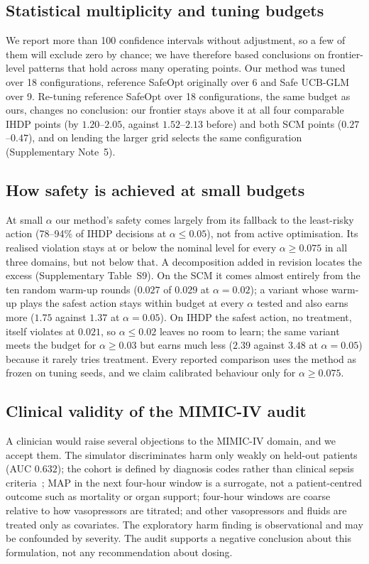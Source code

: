 \documentclass[10pt,a4paper]{article}
\begin{document}
\subsection*{Statistical multiplicity and tuning budgets}
We report more than 100 confidence intervals without adjustment, so a few of them will exclude zero by
chance; we have therefore based conclusions on frontier-level patterns that hold across many operating
points. Our method was tuned over 18 configurations, reference SafeOpt originally over 6 and Safe UCB-GLM over 9. Re-tuning reference SafeOpt over 18 configurations, the same budget as ours, changes no conclusion: our frontier stays above it at all four comparable IHDP points (by $1.20$--$2.05$, against $1.52$--$2.13$ before) and both SCM points ($0.27$--$0.47$), and on lending the larger grid selects the same configuration (Supplementary Note~5).

\subsection*{How safety is achieved at small budgets}
At small $\alpha$ our method's safety comes largely from its fallback to the least-risky action (78--94\% of IHDP decisions at $\alpha\le0.05$), not from active optimisation. Its realised violation stays at or below the nominal level for every $\alpha\ge0.075$ in all three domains, but not below that. A decomposition added in revision locates the excess (Supplementary Table~S9). On the SCM it comes almost entirely from the ten random warm-up rounds ($0.027$ of $0.029$ at $\alpha=0.02$); a variant whose warm-up plays the safest action stays within budget at every $\alpha$ tested and also earns more ($1.75$ against $1.37$ at $\alpha=0.05$). On IHDP the safest action, no treatment, itself violates at $0.021$, so $\alpha\le0.02$ leaves no room to learn; the same variant meets the budget for $\alpha\ge0.03$ but earns much less ($2.39$ against $3.48$ at $\alpha=0.05$) because it rarely tries treatment. Every reported comparison uses the method as frozen on tuning seeds, and we claim calibrated behaviour only for $\alpha\ge0.075$.

\subsection*{Clinical validity of the MIMIC-IV audit}
A clinician would raise several objections to the MIMIC-IV domain, and we accept them. The simulator
discriminates harm only weakly on held-out patients (AUC $0.632$); the cohort is defined by diagnosis
codes rather than clinical sepsis criteria~\cite{singer2016}; MAP in the next four-hour window is a
surrogate, not a patient-centred outcome such as mortality or organ support; four-hour windows are
coarse relative to how vasopressors are titrated; and other vasopressors and fluids are treated only as
covariates. The exploratory harm finding is observational and may be confounded by severity. The audit
supports a negative conclusion about this formulation, not any recommendation about dosing.
\end{document}
